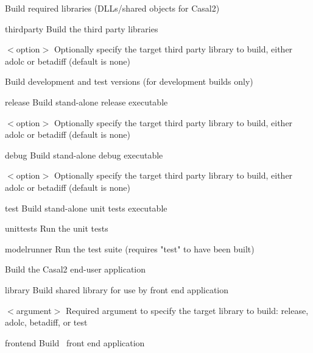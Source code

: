 Build required libraries (DLLs/shared objects for Casal2)
\begin{description}
  \item{thirdparty} Build the third party libraries
  \begin{description}
    \item{$<$option$>$} Optionally specify the target third party library to build, either adolc or betadiff (default is none)
  \end{description}
\end{description}

Build development and test versions (for development builds only)
\begin{description}
\item{release} Build stand-alone release executable
  \begin{description}
	\item{$<$option$>$} Optionally specify the target third party library to build, either adolc or betadiff (default is none)
  \end{description}
  \item{debug} Build stand-alone debug executable
  \begin{description}
	\item{$<$option$>$} Optionally specify the target third party library to build, either adolc or betadiff (default is none)
  \end{description}
  \item{test} Build stand-alone unit tests executable
  \item{unittests} Run the unit tests
  \item{modelrunner} Run the test suite (requires "test" to have been built)
\end{description}

Build the Casal2 end-user application
\begin{description}
  \item{library} Build shared library for use by front end application
  \begin{description}
    \item{$<$argument$>$} Required argument to specify the target library to build: release, adolc, betadiff, or test
  \end{description}
  \item{frontend} Build \CNAME\ front end application
\end{description}

